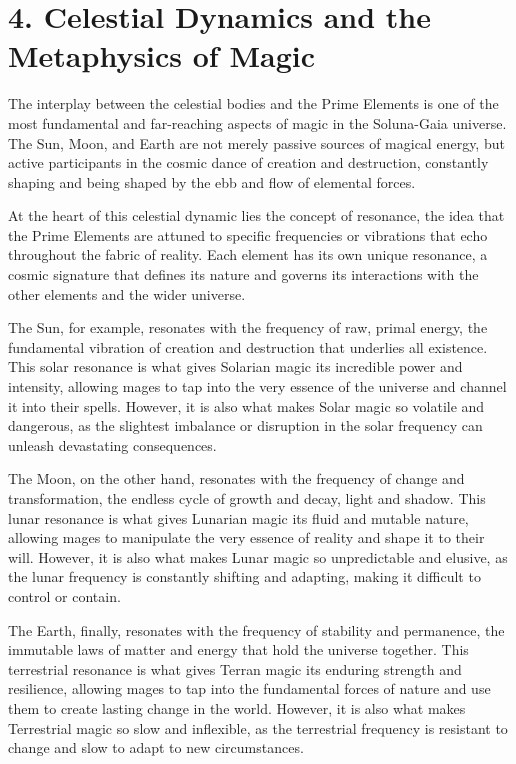 \documentclass[12pt]{article}
\begin{document}
\section{4. Celestial Dynamics and the Metaphysics of Magic}

The interplay between the celestial bodies and the Prime Elements is one of the most fundamental and far-reaching aspects of magic in the Soluna-Gaia universe. The Sun, Moon, and Earth are not merely passive sources of magical energy, but active participants in the cosmic dance of creation and destruction, constantly shaping and being shaped by the ebb and flow of elemental forces.

At the heart of this celestial dynamic lies the concept of resonance, the idea that the Prime Elements are attuned to specific frequencies or vibrations that echo throughout the fabric of reality. Each element has its own unique resonance, a cosmic signature that defines its nature and governs its interactions with the other elements and the wider universe.

The Sun, for example, resonates with the frequency of raw, primal energy, the fundamental vibration of creation and destruction that underlies all existence. This solar resonance is what gives Solarian magic its incredible power and intensity, allowing mages to tap into the very essence of the universe and channel it into their spells. However, it is also what makes Solar magic so volatile and dangerous, as the slightest imbalance or disruption in the solar frequency can unleash devastating consequences.

The Moon, on the other hand, resonates with the frequency of change and transformation, the endless cycle of growth and decay, light and shadow. This lunar resonance is what gives Lunarian magic its fluid and mutable nature, allowing mages to manipulate the very essence of reality and shape it to their will. However, it is also what makes Lunar magic so unpredictable and elusive, as the lunar frequency is constantly shifting and adapting, making it difficult to control or contain.

The Earth, finally, resonates with the frequency of stability and permanence, the immutable laws of matter and energy that hold the universe together. This terrestrial resonance is what gives Terran magic its enduring strength and resilience, allowing mages to tap into the fundamental forces of nature and use them to create lasting change in the world. However, it is also what makes Terrestrial magic so slow and inflexible, as the terrestrial frequency is resistant to change and slow to adapt to new circumstances.
\end{document}
